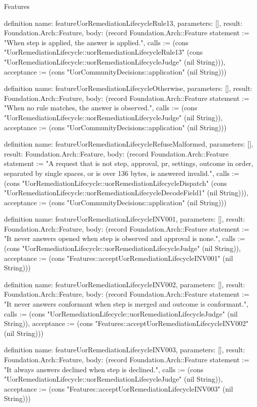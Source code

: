 \begin{lexlean}{Features}
\begin{semanticmodule}
definition{
  name: featureUorRemediationLifecycleRule13,
  parameters: [],
  result: Foundation.Arch::Feature,
  body: (record Foundation.Arch::Feature {statement := "When step is applied, the answer is applied.", calls := (cons "UorRemediationLifecycle::uorRemediationLifecycleRule13" (cons "UorRemediationLifecycle::uorRemediationLifecycleJudge" (nil String))), acceptance := (cons "UorCommunityDecisions::application" (nil String))})
}

definition{
  name: featureUorRemediationLifecycleOtherwise,
  parameters: [],
  result: Foundation.Arch::Feature,
  body: (record Foundation.Arch::Feature {statement := "When no rule matches, the answer is observed.", calls := (cons "UorRemediationLifecycle::uorRemediationLifecycleJudge" (nil String)), acceptance := (cons "UorCommunityDecisions::application" (nil String))})
}

definition{
  name: featureUorRemediationLifecycleRefuseMalformed,
  parameters: [],
  result: Foundation.Arch::Feature,
  body: (record Foundation.Arch::Feature {statement := "A request that is not step, approval, pr, settings, outcome in order, separated by single spaces, or is over 136 bytes, is answered invalid.", calls := (cons "UorRemediationLifecycle::uorRemediationLifecycleDispatch" (cons "UorRemediationLifecycle::uorRemediationLifecycleDecodeField1" (nil String))), acceptance := (cons "UorCommunityDecisions::application" (nil String))})
}

definition{
  name: featureUorRemediationLifecycleINV001,
  parameters: [],
  result: Foundation.Arch::Feature,
  body: (record Foundation.Arch::Feature {statement := "It never answers opened when step is observed and approval is none.", calls := (cons "UorRemediationLifecycle::uorRemediationLifecycleJudge" (nil String)), acceptance := (cons "Features::acceptUorRemediationLifecycleINV001" (nil String))})
}

definition{
  name: featureUorRemediationLifecycleINV002,
  parameters: [],
  result: Foundation.Arch::Feature,
  body: (record Foundation.Arch::Feature {statement := "It never answers conformant when step is merged and outcome is conformant.", calls := (cons "UorRemediationLifecycle::uorRemediationLifecycleJudge" (nil String)), acceptance := (cons "Features::acceptUorRemediationLifecycleINV002" (nil String))})
}

definition{
  name: featureUorRemediationLifecycleINV003,
  parameters: [],
  result: Foundation.Arch::Feature,
  body: (record Foundation.Arch::Feature {statement := "It always answers declined when step is declined.", calls := (cons "UorRemediationLifecycle::uorRemediationLifecycleJudge" (nil String)), acceptance := (cons "Features::acceptUorRemediationLifecycleINV003" (nil String))})
}


\end{semanticmodule}
\end{lexlean}
